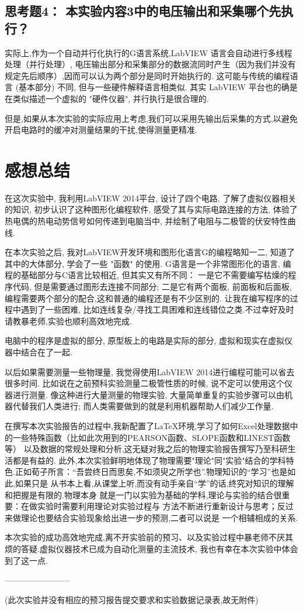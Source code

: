 \documentclass[11pt]{article}
\begin{document}
\subsection*{思考题4：  \textbf{本实验内容3中的电压输出和采集哪个先执行？}}
实际上,作为一个自动并行化执行的G语言系统,LabVIEW 语言会自动进行多线程处理（并行处理）,
电压输出部分和采集部分的数据流同时产生（因为我们并没有规定先后顺序）,因而可以认为两个部分是同时开始执行的.
这可能与传统的编程语言 (基本部分) 不同, 但与一些硬件解释语言相类似. 其实 LabVIEW 平台也的确是在类似描述一个虚拟的 "硬件仪器", 并行执行是很合理的.

但是,如果从本次实验的实际应用上考虑,我们可以采用先输出后采集的方式,以避免开启电路时的缓冲对测量结果的干扰,使得测量更精准.

\newpage
\section{感想总结}
在这次实验中, 
我利用LabVIEW 2014平台, 
设计了四个电路, 了解了虚拟仪器相关的知识, 
初步认识了这种图形化编程软件, 感受了其与实际电路连接的方法, 
体验了热电偶的热电动势信号如何传递到电脑当中, 
并绘制了电阻与二极管的伏安特性曲线.
    
在本次实验之后, 
我对LabVIEW开发环境和图形化语言G的编程略知一二, 
知道了其中的大体部分, 
学会了一些 "函数" 的使用.
 G语言是一个非常图形化的语言, 
 编程的基础部分与C语言比较相近, 但其实又有所不同：
 一是它不需要编写枯燥的程序代码, 
 但是需要通过图形去连接不同部分; 
 二是它有两个面板, 前面板和后面板, 
 编程需要两个部分的配合,这和普通的编程还是有不少区别的.
 让我在编写程序的过程中遇到了一些困难, 
 比如连线复杂/寻找工具困难和连线错位之类.不过幸好及时请教暴老师,实验也顺利高效地完成.

电脑中的程序是虚拟的部分, 
原型板上的电路是实际的部分, 
虚拟和现实在虚拟仪器中结合在了一起. 

以后如果需要测量一些物理量, 
我觉得使用LabVIEW 2014进行编程可能可以省去很多时间. 
比如说在之前预科实验测量二极管性质的时候, 
说不定可以使用这个仪器进行测量. 
像这种进行大量测量的物理实验, 
大量简单重复的实验步骤可以由机器代替我们人类进行; 
而人类需要做到的就是利用机器帮助人们减少工作量.

在撰写本次实验报告的过程中,我新配置了\LaTeX 环境,学习了如何Excel处理数据中的一些特殊函数（比如此次用到的PEARSON函数、SLOPE函数和LINEST函数等）
以及数据的常规处理和分析,这无疑对我之后的物理实验报告撰写乃至科研生活都是有益的.
此外,本次实验鲜明地体现了物理需要"理论"同"实验"结合的学科特色.正如荀子所言：“吾尝终日而思矣,不如须臾之所学也”.物理知识的“学习”也是如此,如果只是
从书本上看,从课堂上听,而没有动手亲自“学”的话,终究对知识的理解和把握是有限的.物理本身
就是一门以实验为基础的学科,理论与实验的结合很重要：在做实验时需要利用理论对实验过程与
方法不断进行重新设计与思考；反过来做理论也要结合实验现象给出进一步的预测,二者可以说是
一个相辅相成的关系.

本次实验的成功高效地完成,离不开实验前的预习、以及实验过程中暴老师不厌其烦的答疑.虚拟仪器技术已成为自动化测量的主流技术,
我也有幸在本次实验中体会到了这一点.

————————

(此次实验并没有相应的预习报告提交要求和实验数据记录表,故无附件)
\end{document}

